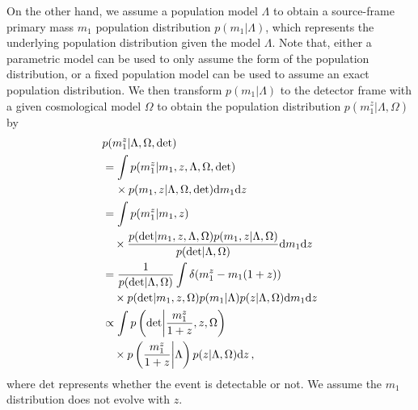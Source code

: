 \documentclass[sn-aps, pdflatex, iicol]{sn-jnl}
\begin{document}
On the other hand, we assume a population model $\Lambda$ to obtain a source-frame primary mass $m_1$ population distribution $p(m_1|\Lambda)$, which represents the underlying population distribution given the model $\Lambda$.
Note that, either a parametric model can be used to only assume the form of the population distribution, or a fixed population model can be used to assume an exact population distribution.
We then transform $p(m_1|\Lambda)$ to the detector frame with a given cosmological model $\Omega$ to obtain the population distribution $p(m^z_1|\Lambda, \Omega)$ by
\begin{equation}
    \mathtoolsset{multlined-width=0.89\displaywidth}
    \begin{aligned}
        &p(m^z_1|\Lambda, \Omega, \mathrm{det}) \\
        &\begin{multlined}
            = \int p(m^z_1|m_1, z, \Lambda, \Omega, \mathrm{det}) \\ \times p(m_1, z|\Lambda, \Omega, \mathrm{det}) \mathrm{d}m_1 \mathrm{d}z
        \end{multlined} \\
        &\begin{multlined}
            = \int p(m^z_1|m_1, z) \\ \times \frac{p(\mathrm{det}|m_1, z, \Lambda, \Omega)p(m_1, z|\Lambda, \Omega)}{p(\mathrm{det}|\Lambda, \Omega)} \mathrm{d}m_1 \mathrm{d}z
        \end{multlined} \\
        &\begin{multlined}
            = \frac{1}{p(\mathrm{det}|\Lambda, \Omega)}\int \delta(m^z_1-m_1(1+z)) \\ \times p(\mathrm{det}|m_1, z, \Omega)p(m_1|\Lambda)p(z|\Lambda, \Omega) \mathrm{d}m_1 \mathrm{d}z
        \end{multlined}\\
        &\begin{multlined}
            \propto \int p\left(\mathrm{det}\middle|\frac{m^z_1}{1+z},z,\Omega\right) \\ \times p\left(\frac{m^z_1}{1+z}\middle|\Lambda\right)p(z|\Lambda, \Omega) \mathrm{d}z\,,
        \end{multlined}
    \end{aligned}
    \label{eq:transformation}
\end{equation}
where $\mathrm{det}$ represents whether the event is detectable or not.
We assume the $m_1$ distribution does not evolve with $z$.
\end{document}
